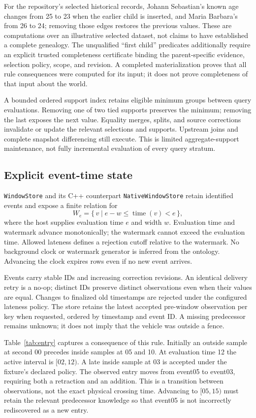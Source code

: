 \documentclass{article}
\newcommand{\code}[1]{\texttt{#1}}
\begin{document}
For the repository's selected historical records, Johann Sebastian's known age
changes from 25 to 23 when the earlier child is inserted, and Maria Barbara's
from 26 to 24; removing those edges restores the previous values. These are
computations over an illustrative selected dataset, not claims to have
established a complete genealogy. The unqualified ``first child'' predicates
additionally require an explicit trusted completeness certificate binding the
parent-specific evidence, selection policy, scope, and revision. A completed
materialization proves that all rule consequences were computed for its input;
it does not prove completeness of that input about the world.

A bounded ordered support index retains eligible minimum groups between query
evaluations. Removing one of two tied supports preserves the minimum; removing
the last exposes the next value. Equality merges, splits, and source corrections
invalidate or update the relevant selections and supports. Upstream joins and
complete snapshot differencing still execute. This is limited aggregate-support
maintenance, not fully incremental evaluation of every query stratum.

\subsection{Explicit event-time state}
\code{WindowStore} and its C++ counterpart \code{NativeWindowStore} retain
identified events and expose a finite relation for
\[
W_e=\{\,v\mid e-w\leq\operatorname{time}(v)<e\,\},
\]
where the host supplies evaluation time $e$ and width $w$. Evaluation time and
watermark advance monotonically; the watermark cannot exceed the evaluation
time. Allowed lateness defines a rejection cutoff relative to the watermark.
No background clock or watermark generator is inferred from the ontology.
Advancing the clock expires rows even if no new event arrives.

Events carry stable IDs and increasing correction revisions. An identical
delivery retry is a no-op; distinct IDs preserve distinct observations even
when their values are equal. Changes to finalized old timestamps are rejected
under the configured lateness policy. The store retains the latest accepted
pre-window observation per key when requested, ordered by timestamp and event
ID. A missing predecessor remains unknown; it does not imply that the vehicle
was outside a fence.

Table~\ref{tab:entry} captures a consequence of this rule. Initially an outside
sample at second 00 precedes inside samples at 05 and 10. At evaluation time
12 the active interval is $[02,12)$. A late inside sample at 03 is accepted
under the fixture's declared policy. The observed entry moves from event05 to
event03, requiring both a retraction and an addition. This is a transition
between observations, not the exact physical crossing time. Advancing to
$[05,15)$ must retain the relevant predecessor knowledge so that event05 is
not incorrectly rediscovered as a new entry.
\end{document}
